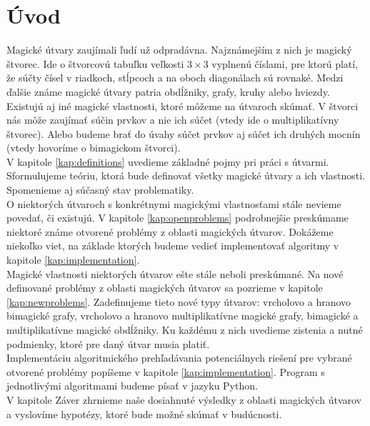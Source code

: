 \chapter*{Úvod} %

Magické útvary zaujímali ľudí už odpradávna. Najznámejším z nich je magický štvorec. Ide o štvorcovú tabuľku veľkosti $3 \times 3$ vyplnenú číslami, pre ktorú platí, že súčty čísel v riadkoch, stĺpcoch a na oboch diagonálach sú rovnaké. Medzi ďalšie známe magické útvary patria obdĺžniky, grafy, kruhy alebo hviezdy. \\

Existujú aj iné magické vlastnosti, ktoré môžeme na útvaroch skúmať. V štvorci nás môže zaujímať súčin prvkov a nie ich súčet (vtedy ide o multiplikatívny štvorec). Alebo budeme brať do úvahy súčet prvkov aj súčet ich druhých mocnín (vtedy hovoríme o bimagickom štvorci). \\

V kapitole \ref{kap:definitions} uvedieme základné pojmy pri práci s útvarmi. Sformulujeme teóriu, ktorá bude definovať všetky magické útvary a ich vlastnosti. Spomenieme aj súčasný stav problematiky. \\

O niektorých útvaroch s konkrétnymi magickými vlastnosťami stále nevieme povedať, či existujú. V kapitole \ref{kap:openproblems} podrobnejšie preskúmame niektoré známe otvorené problémy z oblasti magických útvarov. Dokážeme niekoľko viet, na základe ktorých budeme vedieť implementovať algoritmy v kapitole \ref{kap:implementation}. \\

Magické vlastnosti niektorých útvarov ešte stále neboli preskúmané. Na nové definované problémy z oblasti magických útvarov sa pozrieme v kapitole \ref{kap:newproblems}. Zadefinujeme tieto nové typy útvarov: vrcholovo a hranovo bimagické grafy, vrcholovo a hranovo multiplikatívne magické grafy, bimagické a multiplikatívne magické obdĺžniky. Ku každému z nich uvedieme zistenia a nutné podmienky, ktoré pre daný útvar musia platiť. \\

Implementáciu algoritmického prehľadávania potenciálnych riešení pre vybrané otvorené problémy popíšeme v kapitole \ref{kap:implementation}. Program s jednotlivými algoritmami budeme písať v jazyku Python. \\

V kapitole Záver zhrnieme naše dosiahnuté výsledky z oblasti magických útvarov a vyslovíme hypotézy, ktoré bude možné skúmať v budúcnosti.
